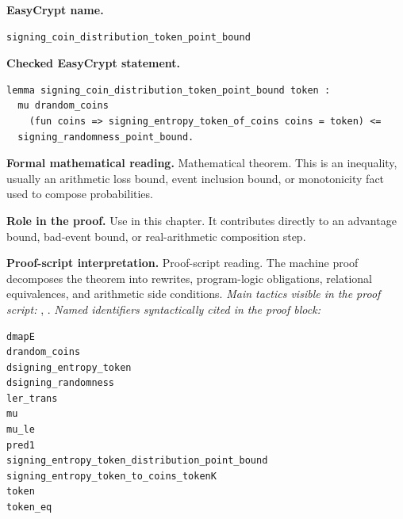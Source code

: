 \begin{formaltheorem}
\noindent\textbf{EasyCrypt name.}
\begin{lstlisting}[language=EasyCrypt,basicstyle=\ttfamily\scriptsize]
signing_coin_distribution_token_point_bound
\end{lstlisting}
\noindent\textbf{Checked EasyCrypt statement.}
\begin{lstlisting}[language=EasyCrypt,basicstyle=\ttfamily\scriptsize]
lemma signing_coin_distribution_token_point_bound token :
  mu drandom_coins
    (fun coins => signing_entropy_token_of_coins coins = token) <=
  signing_randomness_point_bound.
\end{lstlisting}
\noindent\textbf{Formal mathematical reading.}
Mathematical theorem. This is an inequality, usually an arithmetic loss bound, event inclusion bound, or monotonicity fact used to compose probabilities.

\noindent\textbf{Role in the proof.}
Use in this chapter. It contributes directly to an advantage bound, bad-event bound, or real-arithmetic composition step.

\noindent\textbf{Proof-script interpretation.}
Proof-script reading. The machine proof decomposes the theorem into rewrites, program-logic obligations, relational equivalences, and arithmetic side conditions.
\emph{Main tactics visible in the proof script:} , .
\emph{Named identifiers syntactically cited in the proof block:}
\begin{lstlisting}[language=EasyCrypt,basicstyle=\ttfamily\scriptsize]
dmapE
drandom_coins
dsigning_entropy_token
dsigning_randomness
ler_trans
mu
mu_le
pred1
signing_entropy_token_distribution_point_bound
signing_entropy_token_to_coins_tokenK
token
token_eq
\end{lstlisting}

\end{formaltheorem}

